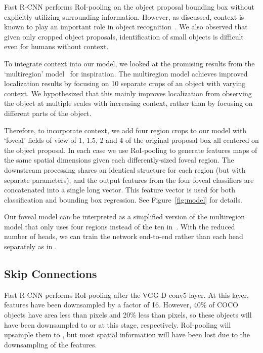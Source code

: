 \documentclass{bmvc2k}
\newcommand{\fig}[1]{Figure~\ref{fig:#1}}
\begin{document}
Fast R-CNN performs RoI-pooling on the object proposal bounding box without explicitly utilizing surrounding information. However, as discussed, context is known to play an important role in object recognition~\cite{torralba2003contextual}. We also observed that given only cropped object proposals, identification of small objects is difficult even for humans without context.

To integrate context into our model, we looked at the promising results from the `multiregion' model~\cite{gidaris2015object} for inspiration. The multiregion model achieves improved localization results by focusing on 10 separate crops of an object with varying context. We hypothesized that this mainly improves localization from observing the object at multiple scales with increasing context, rather than by focusing on different parts of the object.

Therefore, to incorporate context, we add four region crops to our model with `foveal' fields of view of 1, 1.5, 2 and 4 of the original proposal box all centered on the object proposal. In each case we use RoI-pooling to generate features maps of the same spatial dimensions given each differently-sized foveal region. The downstream processing shares an identical structure for each region (but with separate parameters), and the output features from the four foveal classifiers are concatenated into a single long vector. This feature vector is used for both classification and bounding box regression. See \fig{model} for details.

Our foveal model can be interpreted as a simplified version of the multiregion model that only uses four regions instead of the ten in~\cite{gidaris2015object}. With the reduced number of heads, we can train the network end-to-end rather than each head separately as in \cite{gidaris2015object}.

\subsection{Skip Connections}

Fast R-CNN performs RoI-pooling after the VGG-D conv5 layer. At this layer, features have been downsampled by a factor of 16. However, 40\% of COCO objects have area less than  pixels and 20\% less than  pixels, so these objects will have been downsampled to  or  at this stage, respectively. RoI-pooling will upsample them to , but most spatial information will have been lost due to the  downsampling of the features.
\end{document}
